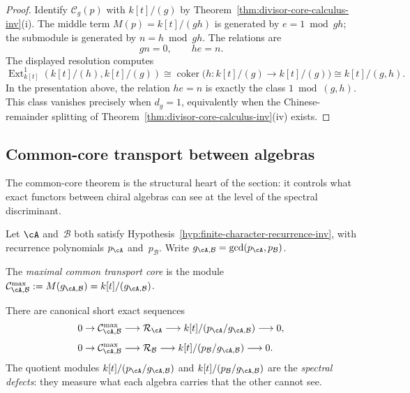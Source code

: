 \begin{proof}
Identify $\mathcal C_g(p)$ with $k[t]/(g)$ by
Theorem~\ref{thm:divisor-core-calculus-inv}(i). The middle term
$M(p)=k[t]/(gh)$ is generated by $e=1\bmod gh$; the submodule is
generated by $n=h\bmod gh$. The relations are
\[
g n=0,\qquad h e=n.
\]
The displayed resolution computes
\[
\operatorname{Ext}^1_{k[t]}(k[t]/(h),k[t]/(g))
\cong
\operatorname{coker}\!\bigl(h:k[t]/(g)\to k[t]/(g)\bigr)
\cong k[t]/(g,h).
\]
In the presentation above, the relation $h e=n$ is exactly the class
$1\bmod (g,h)$. This class vanishes precisely when $d_g=1$,
equivalently when the Chinese-remainder splitting of
Theorem~\ref{thm:divisor-core-calculus-inv}(iv) exists.
\end{proof}

\subsection{Common-core transport between algebras}
\label{subsec:common-core-transport}

The common-core theorem is the structural heart of the
section: it controls what exact functors between chiral
algebras can see at the level of the spectral discriminant.

Let $\cA$ and~$\mathcal{B}$ both satisfy
Hypothesis~\ref{hyp:finite-character-recurrence-inv}, with
recurrence polynomials $p_\cA$ and~$p_\mathcal{B}$. Write
$g_{\cA,\mathcal{B}} = \gcd(p_\cA, p_\mathcal{B})$.

\begin{definition}
\label{def:maximal-common-core}
The \emph{maximal common transport core} is the module
$\mathcal{C}^{\max}_{\cA,\mathcal{B}}
 := M(g_{\cA,\mathcal{B}})
 = k[t]/(g_{\cA,\mathcal{B}})$.
\end{definition}

\begin{theorem}
\label{thm:common-core-exact-sequences-inv}
There are canonical short exact sequences
\begin{align*}
0 \to \mathcal{C}^{\max}_{\cA,\mathcal{B}}
 &\longrightarrow \mathcal{R}_\cA
 \longrightarrow k[t]/(p_\cA/g_{\cA,\mathcal{B}})
 \longrightarrow 0, \\[4pt]
0 \to \mathcal{C}^{\max}_{\cA,\mathcal{B}}
 &\longrightarrow \mathcal{R}_\mathcal{B}
 \longrightarrow k[t]/(p_\mathcal{B}/g_{\cA,\mathcal{B}})
 \longrightarrow 0.
\end{align*}
The quotient modules
$k[t]/(p_\cA/g_{\cA,\mathcal{B}})$ and
$k[t]/(p_\mathcal{B}/g_{\cA,\mathcal{B}})$
are the \emph{spectral defects}: they measure what each
algebra carries that the other cannot see.
\end{theorem}

